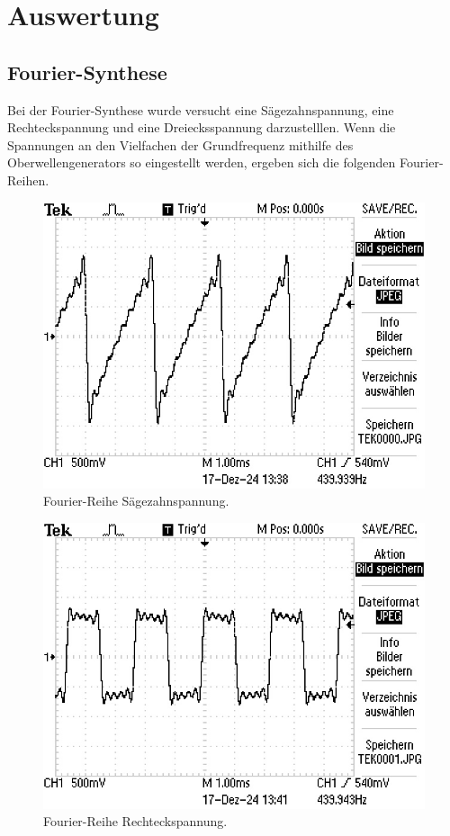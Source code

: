 \section{Auswertung}
\label{sec:Auswertung}

\subsection{Fourier-Synthese}
\noindent Bei der Fourier-Synthese wurde versucht eine 
Sägezahnspannung, eine Rechteckspannung und eine Dreiecksspannung 
darzustelllen. 
\noindent Wenn die Spannungen an den Vielfachen der Grundfrequenz mithilfe des 
Oberwellengenerators so eingestellt werden, ergeben sich die folgenden Fourier-Reihen.
\begin{figure}[H]
    \centering
    \caption{Fourier-Reihe Sägezahnspannung.}
    \includegraphics{Bilder/TEK0000.JPG}
\end{figure}

\begin{figure}[H]
    \centering
    \caption{Fourier-Reihe Rechteckspannung.}
    \includegraphics{Bilder/TEK0001.JPG}
\end{figure}

